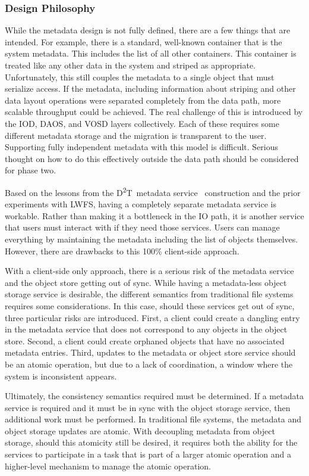 \documentclass[conference]{IEEEtran}
\newcommand{\DDT}{D\textsuperscript{2}T~}
\begin{document}
\subsubsection{Design Philosophy}
While the metadata design is not fully defined, there are a few things that
are intended. For example, there is a standard, well-known container that is
the system metadata. This includes the list of all other containers. This
container is treated like any other data in the system and striped as
appropriate. Unfortunately, this still couples the metadata to a single object
that must serialize access. If the metadata, including information about
striping and other data layout operations were separated completely from the
data path, more scalable throughput could be achieved. The real challenge of
this is introduced by the IOD, DAOS, and VOSD layers collectively. Each of
these requires some different metadata storage and the migration is transparent
to the user.  Supporting fully independent metadata with this model is
difficult. Serious thought on how to do this effectively outside the data path
should be considered for phase two.

Based on the lessons from the \DDT metadata
service~\cite{lofstead:2012:txn-metadata} construction and the prior
experiments with LWFS, having a completely separate metadata service is
workable. Rather than making it a bottleneck in the IO path, it is another
service that users must interact with if they need those services.  Users can
manage everything by maintaining the metadata including the list of objects
themselves. However, there are drawbacks to this 100\% client-side approach.

With a client-side only approach, there is a serious risk of the metadata
service and the object store getting out of sync.  While having a metadata-less
object storage service is desirable, the different semantics from traditional
file systems requires some considerations. In this case, should these services
get out of sync, three particular risks are introduced.  First, a client could
create a dangling entry in the metadata service that does not correspond to any
objects in the object store. Second, a client could create orphaned objects
that have no associated metadata entries. Third, updates to the metadata or
object store service should be an atomic operation, but due to a lack of
coordination, a window where the system is inconsistent appears.

Ultimately, the consistency semantics required must be determined. If a
metadata service is required and it must be in sync with the object storage
service, then additional work must be performed. In traditional file systems,
the metadata and object storage updates are atomic. With decoupling metadata
from object storage, should this atomicity still be desired, it requires both
the ability for the services to participate in a task that is part of a larger
atomic operation and a higher-level mechanism to manage the atomic operation.
\end{document}
